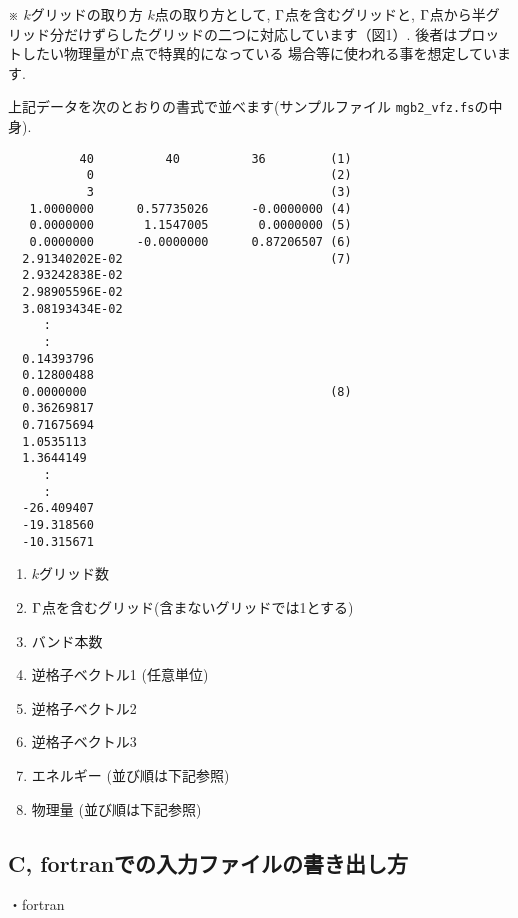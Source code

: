 \documentclass[12pt]{jarticle}
\begin{document}
※ $k$グリッドの取り方
$k$点の取り方として, ${\rm \Gamma}$点を含むグリッドと, 
${\rm \Gamma}$点から半グリッド分だけずらしたグリッドの二つに対応しています（図1）. 
後者はプロットしたい物理量が${\rm \Gamma}$点で特異的になっている
場合等に使われる事を想定しています. 

上記データを次のとおりの書式で並べます(サンプルファイル \verb|mgb2_vfz.fs|の中身). 

\begin{verbatim}
          40          40          36         (1)
           0                                 (2)
           3                                 (3)
   1.0000000      0.57735026      -0.0000000 (4)
   0.0000000       1.1547005       0.0000000 (5)
   0.0000000      -0.0000000      0.87206507 (6)
  2.91340202E-02                             (7)
  2.93242838E-02
  2.98905596E-02
  3.08193434E-02
     :
     :
  0.14393796
  0.12800488
  0.0000000                                  (8)
  0.36269817
  0.71675694
  1.0535113
  1.3644149
     :
     :
  -26.409407
  -19.318560
  -10.315671
\end{verbatim}

\begin{enumerate}
  \renewcommand{\labelenumi}{(\arabic{enumi})}
  \item $k$グリッド数
  \item ${\rm \Gamma}$点を含むグリッド(含まないグリッドでは1とする)
  \item バンド本数
  \item 逆格子ベクトル1 (任意単位)
  \item 逆格子ベクトル2
  \item 逆格子ベクトル3
  \item エネルギー (並び順は下記参照)
  \item 物理量 (並び順は下記参照)
\end{enumerate}

\subsection{C, fortranでの入力ファイルの書き出し方}

・fortran
\end{document}
